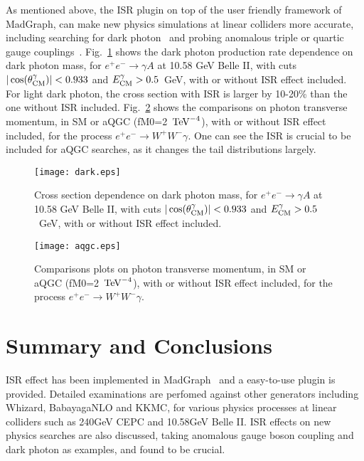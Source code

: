 \documentclass[a4paper,11pt]{article}
\newcommand{\whizard}{{\sc Whizard}}
\newcommand{\madgraph}{{\sc MadGraph}}
\begin{document}
\qquad As mentioned above, the ISR plugin on top of the user friendly framework of \madgraph, can make new physics simulations at linear colliders more accurate, including searching for dark photon~\cite{Aaij:2017rft,Ablikim:2017aab,Lees:2014xha} and probing anomalous triple or quartic gauge couplings~\cite{Yang:2012vv,aqgc1}. Fig.~\ref{fig:isr3} shows the dark photon production rate dependence on dark photon mass, for $e^+e^- \rightarrow \gamma A$ at 10.58 GeV Belle II, with cuts $|\cos(\theta^\gamma_{\rm CM})|<0.933$ and $E_{\rm CM}^{\gamma}>0.5$~GeV, with or without ISR effect included. For light dark photon, the cross section with ISR is larger by 10-20\% than the one without ISR included. Fig.~\ref{fig:isr4} shows the comparisons on photon transverse momentum,  in SM or aQGC (fM0=2~$\rm{TeV}^{-4}$), with or without ISR effect included, for the process $e^+e^- \rightarrow W^+W^- \gamma$. One can see the ISR is crucial to be included for aQGC searches, as it changes the tail distributions largely. 

\begin{figure}[!t]
  \centering
  \texttt{[image: dark.eps]}
  \caption{\label{fig:isr3} Cross section dependence on dark photon mass, for $e^+e^- \rightarrow \gamma A$ at 10.58 GeV Belle II, with cuts $|\cos(\theta^\gamma_{\rm CM})|<0.933$ and $E_{\rm CM}^{\gamma}>0.5$~GeV, with or without ISR effect included.}
\end{figure}

 \begin{figure}[!t]
  \centering
  \texttt{[image: aqgc.eps]}
  \caption{\label{fig:isr4} Comparisons plots on photon transverse momentum, in SM or aQGC (fM0=2~$\rm{TeV}^{-4}$), with or without ISR effect included, for the process $e^+e^- \rightarrow W^+W^- \gamma$.}
\end{figure}


\section{Summary and Conclusions}
\label{talk}
\qquad ISR effect has been implemented in \madgraph~ and a easy-to-use plugin is provided. Detailed examinations are perfomed against other generators including \whizard, BabayagaNLO and KKMC, for various physics processes at linear colliders such as 240GeV CEPC and 10.58GeV Belle II. ISR effects on new physics searches are also discussed, taking anomalous gauge boson coupling and dark photon as examples, and found to be crucial.
\end{document}
